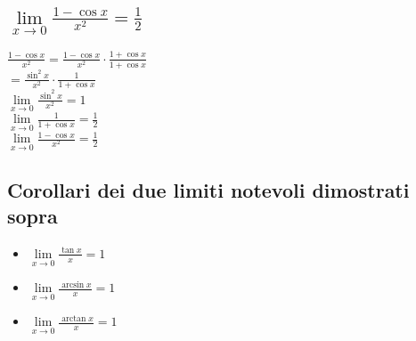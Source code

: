\subsection{$\lim\limits_{x\rightarrow 0} \frac{1-\cos x}{x^2}=\frac{1}{2}$}
$\frac{1-\cos x}{x^2}=\frac{1-\cos x}{x^2}\cdot\frac{1+\cos x}{1+\cos x}$\\
$=\frac{\sin^2 x}{x^2}\cdot\frac{1}{1+\cos x}$\\
$\lim\limits_{x\rightarrow 0}\frac{\sin^2 x}{x^2}=1$\\
$\lim\limits_{x\rightarrow 0}\frac{1}{1+\cos x}=\frac{1}{2}$\\
$\lim\limits_{x\rightarrow 0} \frac{1-\cos x}{x^2}=\frac{1}{2}$
\subsection{Corollari dei due limiti notevoli dimostrati sopra}
\begin{itemize}
\item $\lim\limits_{x\rightarrow 0} \frac{\tan x}{x}=1$
\item $\lim\limits_{x\rightarrow 0} \frac{\arcsin x}{x}=1$
\item $\lim\limits_{x\rightarrow 0} \frac{\arctan x}{x}=1$
\end{itemize}